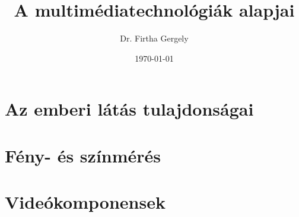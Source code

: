 \documentclass{book}
\title{A multimédiatechnológiák alapjai}
\author{Dr. Firtha Gergely}
\date{\today}
\begin{document}
\sloppy 


\titlepage
\maketitle
\cleardoublepage 
  
\tableofcontents

\setcounter{page}{1}			%
\chapter{Az emberi látás tulajdonságai}
\label{sec:HVS}
 

\chapter{Fény- és színmérés}
\label{sec:colorimetry}


\chapter{Videókomponensek}
\label{sec:video_components}
 
%
%
% 
%
% 
%
% 
\end{document}
